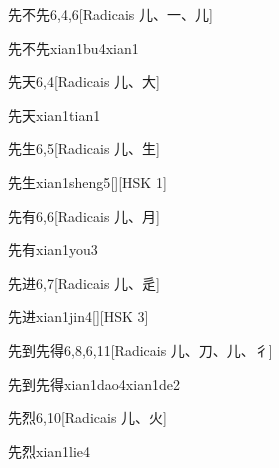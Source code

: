 \begin{entry}{先不先}{6,4,6}[Radicais ⼉、⼀、⼉]
  \begin{phonetics}{先不先}{xian1bu4xian1}
  \end{phonetics}
\end{entry}

\begin{entry}{先天}{6,4}[Radicais ⼉、⼤]
  \begin{phonetics}{先天}{xian1tian1}
  \end{phonetics}
\end{entry}

\begin{entry}{先生}{6,5}[Radicais ⼉、⽣]
  \begin{phonetics}{先生}{xian1sheng5}[][HSK 1]
  \end{phonetics}
\end{entry}

\begin{entry}{先有}{6,6}[Radicais ⼉、⽉]
  \begin{phonetics}{先有}{xian1you3}
  \end{phonetics}
\end{entry}

\begin{entry}{先进}{6,7}[Radicais ⼉、⾡]
  \begin{phonetics}{先进}{xian1jin4}[][HSK 3]
  \end{phonetics}
\end{entry}

\begin{entry}{先到先得}{6,8,6,11}[Radicais ⼉、⼑、⼉、⼻]
  \begin{phonetics}{先到先得}{xian1dao4xian1de2}
  \end{phonetics}
\end{entry}

\begin{entry}{先烈}{6,10}[Radicais ⼉、⽕]
  \begin{phonetics}{先烈}{xian1lie4}
  \end{phonetics}
\end{entry}

